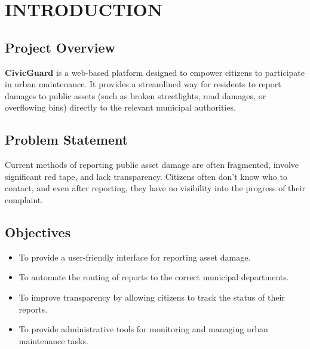 \chapter{INTRODUCTION}

\section{Project Overview}
\textbf{CivicGuard} is a web-based platform designed to empower citizens to participate in urban maintenance. It provides a streamlined way for residents to report damages to public assets (such as broken streetlights, road damages, or overflowing bins) directly to the relevant municipal authorities.

\section{Problem Statement}
Current methods of reporting public asset damage are often fragmented, involve significant red tape, and lack transparency. Citizens often don't know who to contact, and even after reporting, they have no visibility into the progress of their complaint.

\section{Objectives}
\begin{itemize}
    \item To provide a user-friendly interface for reporting asset damage.
    \item To automate the routing of reports to the correct municipal departments.
    \item To improve transparency by allowing citizens to track the status of their reports.
    \item To provide administrative tools for monitoring and managing urban maintenance tasks.
\end{itemize}
